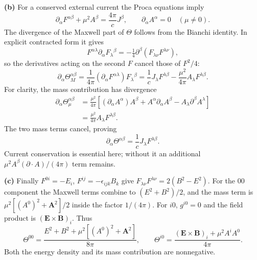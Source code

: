 \medskip\noindent\textbf{(b)} For a conserved external current the Proca equations imply
\[
\partial_\alpha F^{\alpha\beta}+\mu^2A^\beta
=\frac{4\pi}{c}J^\beta,
\qquad \partial_\alpha A^\alpha=0\quad(\mu\ne0).
\]
The divergence of the Maxwell part of $\Theta$ follows from the
Bianchi identity.  In explicit contracted form it gives
\[
F^{\alpha\lambda}\partial_\alpha F_\lambda{}^\beta
=-\tfrac14\partial^\beta(F_{\lambda\nu}F^{\lambda\nu}),
\]
so the derivatives acting on the second $F$ cancel those of $F^2/4$:
\[
\partial_\alpha\Theta_M^{\alpha\beta}
=\frac1{4\pi}(\partial_\alpha F^{\alpha\lambda})F_\lambda{}^\beta
=\frac1cJ_\lambda F^{\lambda\beta}
-\frac{\mu^2}{4\pi}A_\lambda F^{\lambda\beta}.
\]
For clarity, the mass contribution has divergence
\begin{align*}
\partial_\alpha\Theta_{\mu}^{\alpha\beta}
&=\frac{\mu^2}{4\pi}
 [(\partial_\alpha A^\alpha)A^\beta+
 A^\alpha\partial_\alpha A^\beta-A_\lambda\partial^\beta A^\lambda]\\
&=\frac{\mu^2}{4\pi}A_\lambda F^{\lambda\beta}.
\end{align*}
The two mass terms cancel, proving
\[
\boxed{\partial_\alpha\Theta^{\alpha\beta}
=\frac1cJ_\lambda F^{\lambda\beta}.}
\]
Current conservation is essential here; without it an additional
$\mu^2A^\beta(\partial\cdot A)/(4\pi)$ term remains.

\medskip\noindent\textbf{(c)} Finally $F^{0i}=-E_i$, $F^{ij}=-\epsilon_{ijk}B_k$ give
$F_{\lambda\nu}F^{\lambda\nu}=2(B^2-E^2)$.
For the $00$ component the Maxwell terms combine to
$(E^2+B^2)/2$, and the mass term is
$\mu^2[(A^0)^2+\mathbf A^2]/2$ inside the factor $1/(4\pi)$.
For $i0$, $g^{i0}=0$ and the field product is $(\mathbf E\times\mathbf B)_i$.
Thus
\[
\boxed{\Theta^{00}=\frac{E^2+B^2+\mu^2[(A^0)^2+\mathbf A^2]}{8\pi},
\qquad
\Theta^{i0}=\frac{(\mathbf E\times\mathbf B)_i+\mu^2A^iA^0}{4\pi}.}
\]
Both the energy density and its mass contribution are nonnegative.

